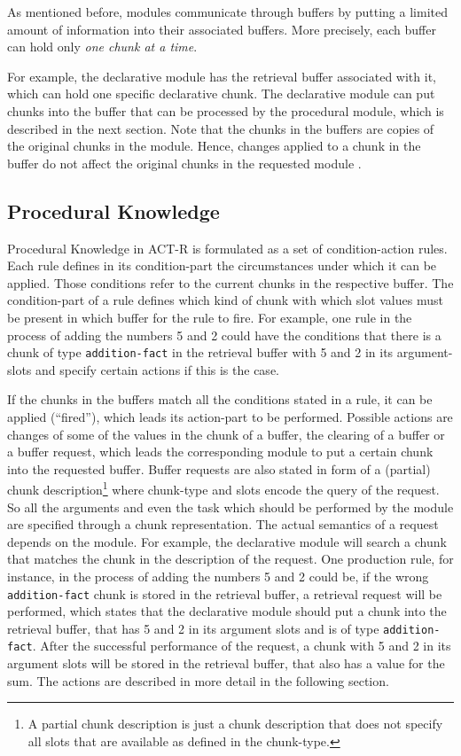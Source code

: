 As mentioned before, modules communicate through buffers by putting a limited amount of information into their associated buffers. More precisely, each buffer can hold only \emph{one chunk at a time}.

For example, the declarative module has the retrieval buffer associated with it, which can hold one specific declarative chunk. The declarative module can put chunks into the buffer that can be processed by the procedural module, which is described in the next section. Note that the chunks in the buffers are copies of the original chunks in the module. Hence, changes applied to a chunk in the buffer do not affect the original chunks in the requested module \cite[unit 1, pp. 18\psq]{actr_tutorial}.

\subsection{Procedural Knowledge}
\label{procedural_knowledge}

Procedural Knowledge in ACT-R is formulated as a set of condition-action rules. Each rule defines in its condition-part the circumstances under which it can be applied. Those conditions refer to the current chunks in the respective buffer. The condition-part of a rule defines which kind of chunk with which slot values must be present in which buffer for the rule to fire. For example, one rule in the process of adding the numbers 5 and 2 could have the conditions that there is a chunk of type \verb|addition-fact| in the retrieval buffer with 5 and 2 in its argument-slots and specify certain actions if this is the case.

If the chunks in the buffers match all the conditions stated in a rule, it can be applied (``fired''), which leads its action-part to be performed. Possible actions are changes of some of the values in the chunk of a buffer, the clearing of a buffer or a buffer request, which leads the corresponding module to put a certain chunk into the requested buffer. Buffer requests are also stated in form of a (partial) chunk description\footnote{A partial chunk description is just a chunk description that does not specify all slots that are available as defined in the chunk-type.} where chunk-type and slots encode the query of the request. So all the arguments and even the task which should be performed by the module are specified through a chunk representation. The actual semantics of a request depends on the module. For example, the declarative module will search a chunk that matches the chunk in the description of the request. One production rule, for instance, in the process of adding the numbers 5 and 2 could be, if the wrong \verb|addition-fact| chunk is stored in the retrieval buffer, a retrieval request will be performed, which states that the declarative module should put a chunk into the retrieval buffer, that has 5 and 2 in its argument slots and is of type \verb|addition-fact|. After the successful performance of the request, a chunk with 5 and 2 in its argument slots will be stored in the retrieval buffer, that also has a value for the sum. The actions are described in more detail in the following section.


